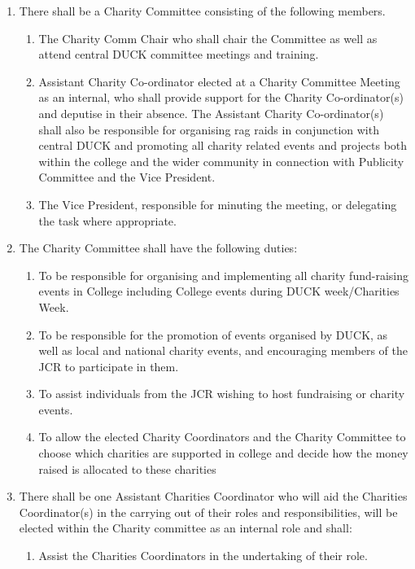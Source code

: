 \begin{enumerate}
    \item There shall be a Charity Committee consisting of the following members.
    \begin{enumerate}
        \item The Charity Comm Chair who shall chair the Committee as well as attend central DUCK committee meetings and training.
        \item Assistant Charity Co-ordinator elected at a Charity Committee Meeting as an internal, who shall provide support for the Charity Co-ordinator(s) and deputise in their absence. The Assistant Charity Co-ordinator(s) shall also be responsible for organising rag raids in conjunction with central DUCK and promoting all charity related events and projects both within the college and the wider community in connection with Publicity Committee and the Vice President.
        \item The Vice President, responsible for minuting the meeting, or delegating the task where appropriate.
    \end{enumerate}
    \item The Charity Committee shall have the following duties:
    \begin{enumerate}
        \item To be responsible for organising and implementing all charity fund-raising events in College including College events during DUCK week/Charities Week.
        \item To be responsible for the promotion of events organised by DUCK, as well as local and national charity events, and encouraging members of the JCR to participate in them.
        \item To assist individuals from the JCR wishing to host fundraising or charity events.
        \item To allow the elected Charity Coordinators and the Charity Committee to choose which charities are supported in college and decide how the money raised is allocated to these charities
    \end{enumerate}
    \item There shall be one Assistant Charities Coordinator who will aid the Charities Coordinator(s) in the carrying out of their roles and responsibilities, will be elected within the Charity committee as an internal role and shall:
    \begin{enumerate}
        \item Assist the Charities Coordinators in the undertaking of their role. 

\end{enumerate}
\end{enumerate}
